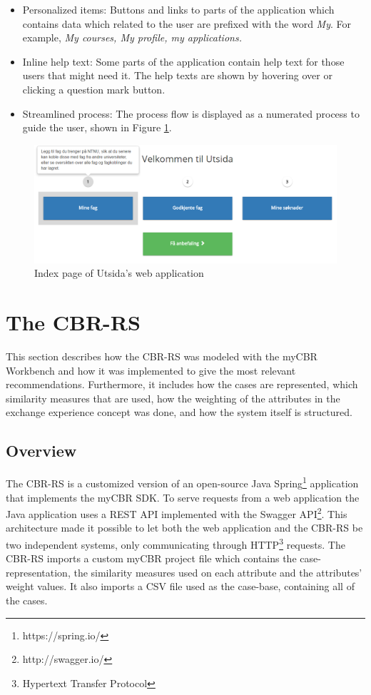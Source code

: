 \begin{itemize}
    \item Personalized items: Buttons and links to parts of the application which contains data which related to the user are prefixed with the word \emph{My}. For example, \emph{My courses, My profile, my applications.}
    \item Inline help text: Some parts of the application contain help text for those users that might need it. The help texts are shown by hovering over or clicking a question mark button. 
    \item Streamlined process: The process flow is displayed as a numerated process to guide the user, shown in Figure \ref{fig:utsida_index}.
\end{itemize}

\begin{figure}[h]
    \centering
    \includegraphics[width=1\textwidth]{fig/utsida_screenshots/steps.png}
    \caption{Index page of Utsida's web application}
    \label{fig:utsida_index}
\end{figure}

\section{The CBR-RS}

This section describes how the CBR-RS was modeled with the myCBR Workbench and how it was implemented to give the most relevant recommendations. Furthermore, it includes how the cases are represented, which similarity measures that are used, how the weighting of the attributes in the exchange experience concept was done, and how the system itself is structured.

\subsection{Overview}

The CBR-RS is a customized version of an open-source Java Spring\footnote{https://spring.io/} application that implements the myCBR SDK. To serve requests from a web application the Java application uses a REST API implemented with the Swagger API\footnote{http://swagger.io/}. This architecture made it possible to let both the web application and the CBR-RS be two independent systems, only communicating through HTTP\footnote{Hypertext Transfer Protocol} requests. The CBR-RS imports a custom myCBR project file which contains the case-representation, the similarity measures used on each attribute and the attributes' weight values. It also imports a CSV file used as the case-base, containing all of the cases.

